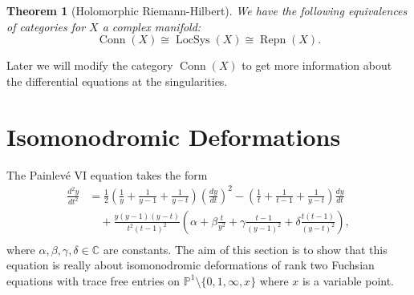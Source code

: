 \documentclass[12pt]{book}
\numberwithin{equation}{section}
\newtheorem{theorem}{Theorem}[subsection]
\theoremstyle{definition}
\theoremstyle{remark}
\newcommand{\CC}{\mathbb{C}}
\newcommand{\PP}{\mathbb{P}}
\newcommand{\LocSys}{\operatorname{LocSys}}
\newcommand{\Conn}{\operatorname{Conn}}
\newcommand{\Repn}{\operatorname{Repn}}
\begin{document}
\begin{theorem}[Holomorphic Riemann-Hilbert]
	We have the following equivalences of categories for $X$ a complex manifold:
	$$ \Conn(X) \cong \LocSys(X) \cong \Repn(X).$$
\end{theorem}

Later we will modify the category $\Conn(X)$ to get more information about the differential equations at the singularities. 


\chapter{Isomonodromic Deformations}

The Painlev\'e VI equation takes the form
 \begin{align*}\frac{d^2y}{dt^2}&=
 \frac{1}{2}\left(\frac{1}{y}+\frac{1}{y-1}+\frac{1}{y-t}\right)\left( \frac{dy}{dt} \right)^2
 -\left(\frac{1}{t}+\frac{1}{t-1}+\frac{1}{y-t}\right)\frac{dy}{dt} \\&\quad +
 \frac{y(y-1)(y-t)}{t^2(t-1)^2}
 \left(\alpha+\beta\frac{t}{y^2}+\gamma\frac{t-1}{(y-1)^2}+\delta\frac{t(t-1)}{(y-t)^2}\right),\\ 
 \end{align*}
where $\alpha,\beta,\gamma,\delta \in \CC$ are constants.
The aim of this section is to show that this equation is really about isomonodromic deformations of rank two Fuchsian equations with trace free entries on $\PP^1\setminus \lbrace 0,1,\infty, x\rbrace$ where $x$ is a variable point.



\end{document}
